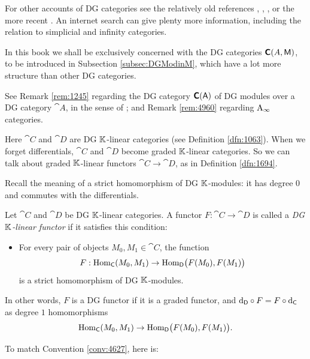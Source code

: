 \begin{rem} \label{rem:1175}
For other accounts of DG categories see the relatively old references 
\cite{Kelly}, \cite{Kel1}, \cite{BoKa}, or the more recent \cite{To1}. 
An internet search can give plenty more information,
including the relation to simplicial and infinity categories. 

In this book we shall be exclusively concerned with the DG categories 
$\boldsymbol{\mathsf{C}}(A, \operatorname{\mathsf{M}})$, to be introduced in Subsection \ref{subsec:DGModinM},
which have a lot more structure than other DG categories.

See Remark \ref{rem:1245} regarding the DG category
$\boldsymbol{\mathsf{C}}(\operatorname{\mathsf{A}})$ of DG modules over a DG category $\cat{A}$, 
in the sense of \cite{Kel1}; and Remark \ref{rem:4960} regarding 
$\mathrm{A}_{\infty}$ categories. 
\end{rem}



 \label{subsec:DGFunc}

Here $\cat{C}$ and $\cat{D}$ are DG $\mathbb{K}$-linear categories (see Definition 
\ref{dfn:1063}). When we forget differentials,  $\cat{C}$ and $\cat{D}$ become 
graded $\mathbb{K}$-linear categories. So we can talk about graded $\mathbb{K}$-linear
functors $\cat{C} \to \cat{D}$, as in Definition \ref{dfn:1694}. 

Recall the meaning of a strict homomorphism of DG $\mathbb{K}$-modules:
it has degree $0$ and commutes with the differentials. 

\begin{dfn} \label{dfn:1065}
Let $\cat{C}$ and $\cat{D}$ be DG $\mathbb{K}$-linear categories.
A functor  $F : \cat{C} \to \cat{D}$
is called a {\em DG $\mathbb{K}$-linear functor}
if it satisfies this condition: 
\begin{itemize}
\item[$\vartriangleright$] For every pair of objects $M_0, M_1 \in \cat{C}$, 
the function 
\[ F : \operatorname{Hom}_{\operatorname{\mathsf{C}}}(M_0, M_1) \to  
\operatorname{Hom}_{\operatorname{\mathsf{D}}} \bigl( F(M_0), F(M_1) \bigr) \] 
is a strict homomorphism of DG $\mathbb{K}$-modules. 
\end{itemize}
\end{dfn}

In other words, $F$ is a DG functor if it is a graded functor, and 
$\mathrm{d}_{\operatorname{\mathsf{D}}} \circ F = F \circ \mathrm{d}_{\operatorname{\mathsf{C}}}$
as degree $1$ homomorphisms 
\[ \operatorname{Hom}_{\operatorname{\mathsf{C}}}(M_0, M_1) \to  
\operatorname{Hom}_{\operatorname{\mathsf{D}}} \bigl( F(M_0), F(M_1) \bigr) . \]

To match Convention \ref{conv:4627}, here is: 

